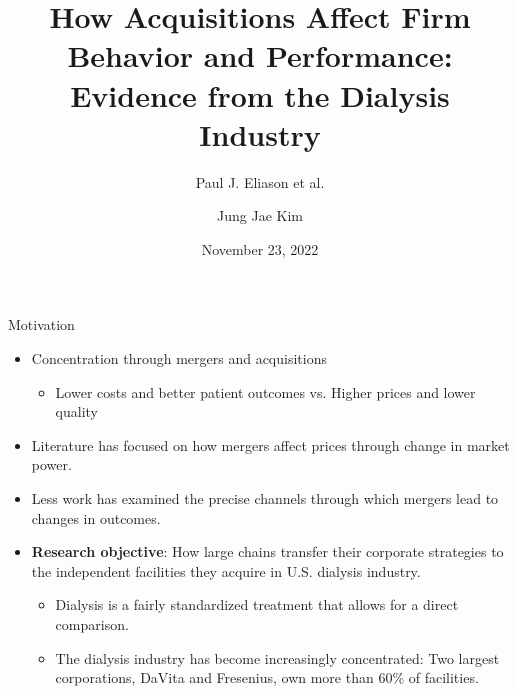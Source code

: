 \documentclass[aspectratio=169]{beamer}
\title{How Acquisitions Affect Firm Behavior and Performance: Evidence from the Dialysis Industry}
\subtitle{Paul J. Eliason et al.}
\date{November 23, 2022}
\author{Jung Jae Kim}
\begin{document}

\maketitle

\begin{frame}{Motivation}

\begin{itemize}
\item Concentration through mergers and acquisitions 
    \begin{itemize}
        \item Lower costs and better patient outcomes vs. Higher prices and lower quality
    \end{itemize}
\item Literature has focused on how mergers affect prices through change in market power.
\item Less work has examined the precise channels through which mergers lead to changes in outcomes.
\end{itemize}

\begin{itemize}
    \item[] \textbf{Research objective}: How large chains transfer their corporate strategies to the independent facilities they acquire in U.S. dialysis industry.
    \begin{itemize}
        \item Dialysis is a fairly standardized treatment that allows for a direct comparison.
        \item The dialysis industry has become increasingly concentrated: Two largest corporations, DaVita and Fresenius, own more than 60\% of facilities.
    \end{itemize}
\end{itemize}

\end{frame}
\end{document}
